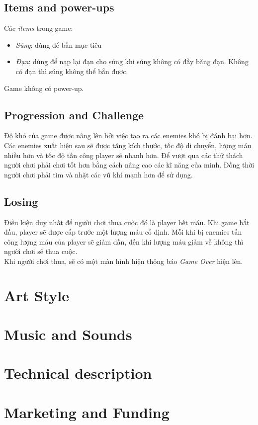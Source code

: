 \documentclass[14pt,a4paper]{extreport}
\begin{document}
\section{Items and power-ups}
Các \textit{items} trong game: 
\begin{itemize}
	\item \textit{Súng}: dùng để bắn mục tiêu
	\item \textit{Đạn}: dùng để nạp lại đạn cho súng khi súng không có đầy băng đạn. Không có đạn thì súng không thể bắn được.

\end{itemize}

Game không có power-up.

\section{Progression and Challenge}
Độ khó của game được nâng lên bởi việc tạo ra các enemies khó bị đánh bại hơn. Các enemies xuất hiện sau sẽ được tăng kích thước, tốc độ di chuyển, lượng máu nhiều hơn và tốc độ tấn công player sẽ nhanh hơn. Để vượt qua các thử thách người chơi phải chơi tốt hơn bằng cách nâng cao các kĩ năng của mình. Đồng thời người chơi phải tìm và nhặt các vũ khí mạnh hơn để sử dụng.


\section{Losing}
Điều kiện duy nhất để người chơi thua cuộc đó là player hết máu. Khi game bắt đầu, player sẽ được cấp trước một lượng máu cố định. Mỗi khi bị enemies tấn công lượng máu của player sẽ giảm dần, đến khi lượng máu giảm về không thì người chơi sẽ thua cuộc. \\
Khi người chơi thua, sẽ có một màn hình hiện thông báo \textit{Game Over} hiện lên.

\chapter{Art Style}
\chapter{Music and Sounds}
\chapter{Technical description}
\chapter{Marketing and Funding}
\end{document}
